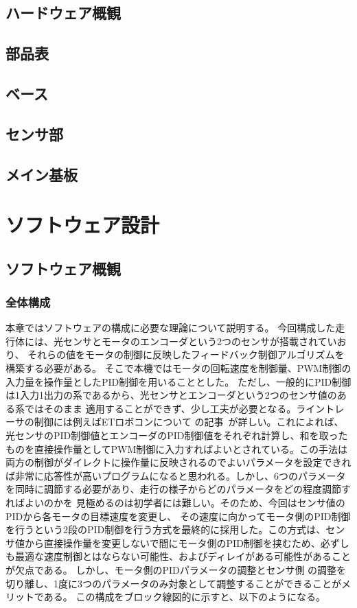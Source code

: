 \documentclass{ltjsreport}
\begin{document}
\section{ハードウェア概観}

\section{部品表}

\section{ベース}

\section{センサ部}

\section{メイン基板}







\chapter{ソフトウェア設計}
\section{ソフトウェア概観}
\subsection{全体構成}
本章ではソフトウェアの構成に必要な理論について説明する。
今回構成した走行体には、光センサとモータのエンコーダという2つのセンサが搭載されていおり、
それらの値をモータの制御に反映したフィードバック制御アルゴリズムを構築する必要がある。
そこで本機ではモータの回転速度を制御量、PWM制御の入力量を操作量としたPID制御を用いることとした。
ただし、一般的にPID制御は1入力1出力の系であるから、光センサとエンコーダという2つのセンサ値のある系ではそのまま
適用することができず、少し工夫が必要となる。ライントレーサの制御には例えばETロボコンについて
の記事~\cite{ETM}が詳しい。これによれば、光センサのPID制御値とエンコーダのPID制御値をそれぞれ計算し、和を取ったものを直接操作量としてPWM制御に入力すればよいとされている。この手法は両方の制御がダイレクトに操作量に反映されるのでよいパラメータを設定できれば非常に応答性が高いプログラムになると思われる。しかし、6つのパラメータを同時に調節する必要があり、走行の様子からどのパラメータをどの程度調節すればよいのかを
見極めるのは初学者には難しい。そのため、今回はセンサ値のPIDから各モータの目標速度を変更し、
その速度に向かってモータ側のPID制御を行うという2段のPID制御を行う方式を最終的に採用した。この方式は、センサ値から直接操作量を変更しないで間にモータ側のPID制御を挟むため、必ずしも最適な速度制御とはならない可能性、およびディレイがある可能性があることが欠点である。
しかし、モータ側のPIDパラメータの調整とセンサ側
の調整を切り離し、1度に3つのパラメータのみ対象として調整することができることがメリットである。
この構成をブロック線図的に示すと、以下のようになる。
\end{document}
